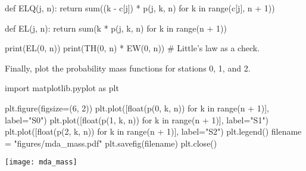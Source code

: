 \begin{exercise}
\begin{solution}
\begin{pyconsole}
def ELQ(j, n):
    return sum((k - c[j]) * p(j, k, n) for k in range(c[j], n + 1))


def EL(j, n):
    return sum(k * p(j, k, n) for k in range(n + 1))

print(EL(0, n))
print(TH(0, n) * EW(0, n)) # Little's law as a check.
  
\end{pyconsole}

Finally, plot the probability mass functions for stations 0, 1, and 2.

  
\begin{pyconsole}
import matplotlib.pyplot as plt

plt.figure(figsize=(6, 2))
plt.plot([float(p(0, k, n)) for k in range(n + 1)], label="S0")
plt.plot([float(p(1, k, n)) for k in range(n + 1)], label="S1")
plt.plot([float(p(2, k, n)) for k in range(n + 1)], label="S2")
plt.legend()
filename = "figures/mda_mass.pdf"
plt.savefig(filename)
plt.close()
  
\end{pyconsole}

\texttt{[image: mda\_mass]}

  \end{solution}
\end{exercise}






